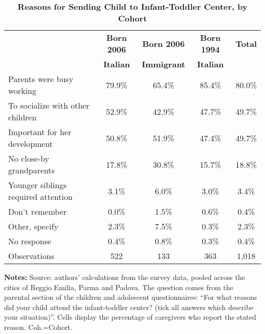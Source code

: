 \begin{table}[ht!]
\caption{\textbf{Reasons for Sending Child to Infant-Toddler Center, by Cohort}}
\label{tab:SumMotiveAsilo}
\begin{center}
 \scriptsize
 \begin{tabular}{ l c c c c }
\hline \hline
& \textbf{Born 2006} & \textbf{Born 2006} & \textbf{Born 1994} & \textbf{Total} \\
& \textbf{Italian} & \textbf{Immigrant} & \textbf{Italian} & \textbf{} \\
\hline
Parents were busy working           & 79.9\% & 65.4\% & 85.4\% & 80.0\% \\[0.2em]
To socialize with other children    & 52.9\% & 42.9\% & 47.7\% & 49.7\% \\[0.2em]
Important for her development       & 50.8\% & 51.9\% & 47.4\% & 49.7\% \\[0.2em]
No close-by grandparents            & 17.8\% & 30.8\% & 15.7\% & 18.8\% \\[0.2em]
Younger siblings required attention &  3.1\% &  6.0\% &  3.0\% &  3.4\% \\[0.2em]
Don't remember                      &  0.0\% &  1.5\% &  0.6\% &  0.4\% \\[0.2em]
Other, specify                      &  2.3\% &  7.5\% &  0.3\% &  2.3\% \\[0.2em]
No response                         &  0.4\% &  0.8\% &  0.3\% &  0.4\% \\
\hline
Observations                        &   522 &   133 &   363 & 1,018 \\
\hline
\end{tabular}
\end{center} \begin{flushleft}
\tiny{{\bfseries Notes:} Source: authors' calculations from the survey data, pooled across the cities of Reggio Emilia, Parma and Padova. The question comes from the parental section of the children and adolescent questionnaires: ``For what reasons did your child attend the infant-toddler center? (tick all answers which describe your situation)''. Cells display the percentage of caregivers who report the stated reason. Coh.=Cohort.}
\end{flushleft} \end{table}
